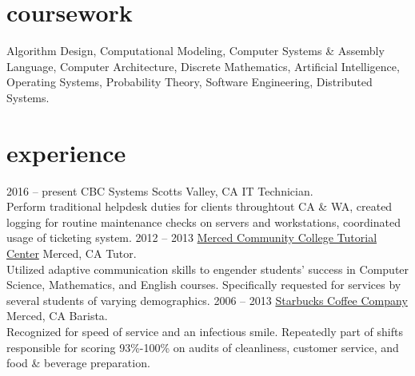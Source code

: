 \documentclass[]{./friggeri-cv}
\begin{document}
\section{coursework}
Algorithm Design, %
Computational Modeling, %
Computer Systems \& Assembly Language, %
Computer Architecture, %
Discrete Mathematics, %
Artificial Intelligence, %
Operating Systems, %
Probability Theory, %
Software Engineering, %
Distributed Systems. %
\section{experience}
\begin{entrylist}
\entry
    {2016 -- present}
    {CBC Systems}
    {Scotts Valley, CA}
    {{\rolefont IT Technician.}\\Perform traditional helpdesk duties for clients
    throughtout CA \& WA, created
    logging for routine maintenance checks on servers and workstations, coordinated
    usage of ticketing system.}
\entry
    {2012 -- 2013}
    {\href{http://www.mccd.edu/resources/tutoring/tutorial-center.html}{Merced Community College Tutorial Center}}
    {Merced, CA}
    {{\rolefont Tutor.}\\Utilized adaptive communication skills to engender students'
    success in Computer Science, Mathematics, and English courses. Specifically 
    requested for services by several students of varying demographics.}
\entry
    {2006 -- 2013}
    {\href{http://wisequacks.org/wp2/wp-content/uploads/2012/05/coffee.jpg}{Starbucks Coffee Company}}
    {Merced, CA}
    {{\rolefont Barista.}\\Recognized for speed of service and an infectious smile.
    Repeatedly part of shifts responsible for scoring 93\%-100\% on audits of
    cleanliness, customer service, and food \& beverage preparation.}
\end{entrylist}
\end{document}
